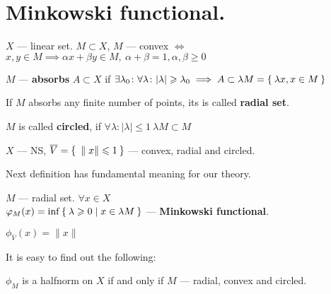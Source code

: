 \section{Minkowski functional.}
$X$ --- linear set. $M \subset X$, $M$ --- convex $\iff$ $x,y \in M \implies
\alpha x + \beta y \in M,\ \alpha + \beta = 1, \alpha, \beta \geq 0$
\begin{defn}
  $M$ --- \textbf{absorbs} $A \subset X$ if $\exists \lambda_0 \colon \forall
  \lambda \colon |\lambda| \geqslant \lambda_0 \implies A \subset \lambda M =
  \Set{\lambda x, x \in M}$
\end{defn}

\begin{defn}
  If $M$ absorbs any finite number of points, its is called \textbf{radial set}.
\end{defn}

\begin{defn}
  $M$ is called \textbf{circled}, if $\forall \lambda \colon |\lambda| \leq 1\ \lambda M
  \subset M$
\end{defn}

\begin{ex}
  $X$ --- NS, $\overline{V} = \Set{\|x\| \leqslant1}$ --- convex, radial and circled.
\end{ex}

Next definition has fundamental meaning for our theory.
\begin{defn}
  $M$ --- radial set. $\forall x \in X$ \\
  $\varphi_M(x) = \inf \Set{\lambda \geqslant0 | x \in \lambda M}$ ---
  \textbf{Minkowski functional}.
\end{defn}

\begin{ex}
  $\phi_{\overline{V}}(x) = \|x\|$
\end{ex}

It is easy to find out the following:
\begin{stm}
  $\phi_M$ is a halfnorm on $X$ if and only if $M$ --- radial, convex and circled.
\end{stm}